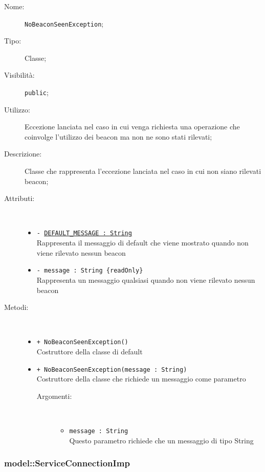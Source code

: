 \documentclass[../DefinizioneDiProdotto.tex]{subfiles}
\begin{document}
    \begin{description}
\item[Nome:] \texttt{NoBeaconSeenException};
\item[Tipo:] Classe;
\item[Visibilità:] \texttt{public};
\item[Utilizzo:] Eccezione lanciata nel caso in cui venga richiesta una operazione che coinvolge l'utilizzo dei beacon ma non ne sono stati rilevati;
\item[Descrizione:] Classe che rappresenta l'eccezione lanciata nel caso in cui non siano rilevati beacon;
\item[Attributi:] \
\begin{itemize}
\item \texttt{- \underline{DEFAULT\_MESSAGE : String}}\\
Rappresenta il messaggio di default che viene mostrato quando non viene rilevato nessun beacon

\item \texttt{- message : String \{readOnly\}}\\
Rappresenta un messaggio qualsiasi quando non viene rilevato nessun beacon

\end{itemize}
\item[Metodi:] \
\begin{itemize}
\item \texttt{+ NoBeaconSeenException()}\\
Costruttore della classe di default
 \item \texttt{+ NoBeaconSeenException(message : String)}\\
Costruttore della classe che richiede un messaggio come parametro
 \begin{description}
\item[Argomenti:] \
\begin{itemize}
\item \texttt{message : String}\\
Questo parametro richiede che un messaggio di tipo  String\end{itemize}
\end{description}
\end{itemize}
\end{description}

\subsubsection{model::ServiceConnectionImp}
\end{document}

